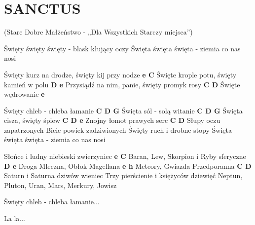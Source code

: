 \documentclass[../../../songbook.tex]{subfiles}
\begin{document}
\section*{SANCTUS}	
(Stare Dobre Małżeństwo - „Dla Wszystkich Starczy miejsca”) \newline

			
Święty święty święty - blask kłujący oczy \newline
Święta święta święta - ziemia co nas nosi \newline
	
Święty kurz na drodze, święty kij przy nodze		\textbf{e C} \newline
Święte krople potu, święty kamień w polu		\textbf{D e} \newline
Przysiądź na nim, panie, święty promyk rosy	  \textbf{C D} \newline
Święte wędrowanie					\textbf{e} \newline

	Święty chleb - chleba łamanie		\textbf{C D G} \newline
	Święta sól - solą witanie			\textbf{C D G} \newline
	Święta cisza, święty śpiew		\textbf{C D e} \newline
	Znojny łomot prawych serc		\textbf{C D} \newline
	Słupy oczu zapatrzonych
	Bicie powiek zadziwionych
	Święty ruch i drobne stopy
	Święta święta święta - ziemia co nas nosi

Słońce i ludny niebieski zwierzyniec			\textbf{e C} \newline
Baran, Lew, Skorpion i Ryby sferyczne			\textbf{D e} \newline
Droga Mleczna, Obłok Magellana			\textbf{e h} \newline
Meteory, Gwiazda Przedporanna			\textbf{C D} \newline
Saturn i Saturna dziwów wieniec
Trzy pierścienie i księżyców dziewięć
Neptun, Pluton, Uran, Mars, Merkury, Jowisz
	
	Święty chleb - chleba łamanie... \newline

La la...
\end{document}
